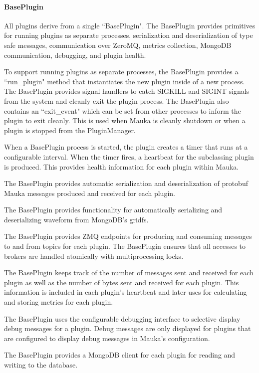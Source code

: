 \paragraph{BasePlugin}
All plugins derive from a single ``BasePlugin". The BasePlugin provides primitives for running plugins as separate processes, serialization and deserialization of type safe messages, communication over ZeroMQ, metrics collection, MongoDB communication, debugging, and plugin health.

To support running plugins as separate processes, the BasePlugin provides a ``run\_plugin" method that instantiates the new plugin inside of a new process. The BasePlugin provides signal handlers to catch SIGKILL and SIGINT signals from the system and cleanly exit the plugin process. The BasePlugin also contains an ``exit\_event" which can be set from other processes to inform the plugin to exit cleanly. This is used when Mauka is cleanly shutdown or when a plugin is stopped from the PluginManager.

When a BasePlugin process is started, the plugin creates a timer that runs at a configurable interval. When the timer fires, a heartbeat for the subclassing plugin is produced. This provides health information for each plugin within Mauka.

The BasePlugin provides automatic serialization and deserialization of protobuf Mauka messages produced and received for each plugin.

The BasePlugin provides functionality for automatically serializing and deserializing waveform from MongoDB's gridfs. 

The BasePlugin provides ZMQ endpoints for producing and consuming messages to and from topics for each plugin. The BasePlugin ensures that all accesses to brokers are handled atomically with multiprocessing locks.

The BasePlugin keeps track of the number of messages sent and received for each plugin as well as the number of bytes sent and received for each plugin. This information is included in each plugin's heartbeat and later uses for calculating and storing metrics for each plugin.

The BasePlugin uses the configurable debugging interface to selective display debug messages for a plugin. Debug messages are only displayed for plugins that are configured to display debug messages in Mauka's configuration.

The BasePlugin provides a MongoDB client for each plugin for reading and writing to the database.

